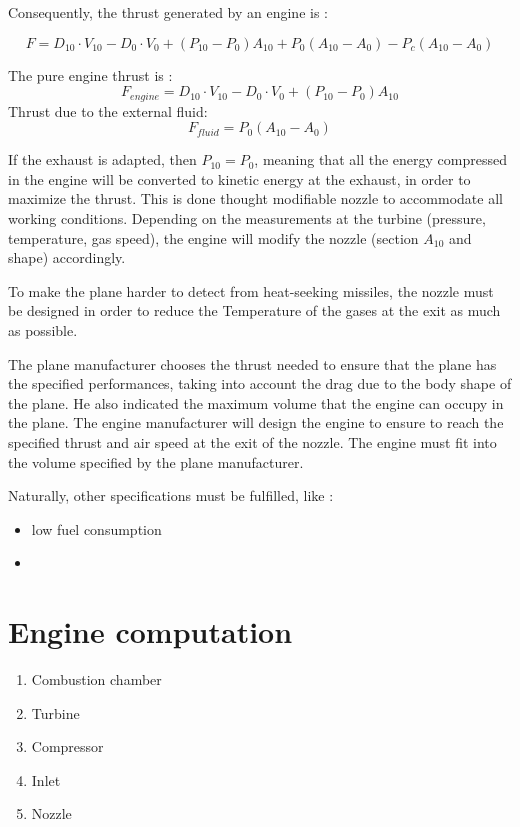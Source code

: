 \documentclass[12pt,a4paper]{article}
\begin{document}
	Consequently, the thrust generated by an engine is : 
	
	\begin{dmath}
		F = D_{10} \cdot V_{10} - D_{0} \cdot V_{0} + (P_{10} - P_0) A_{10} + P_0 (A_{10} -A_0) -  P_c (A_{10} - A_0)
	\end{dmath}
	
	The pure engine thrust is : 
	\begin{dmath}
		F_{engine} = D_{10} \cdot V_{10} - D_{0} \cdot V_{0} + (P_{10} - P_0) A_{10}
	\end{dmath}
	Thrust due to the external fluid:  
	\begin{dmath}
		F_{fluid} = P_0 (A_{10} -A_0)
	\end{dmath}
	
	If the exhaust is adapted, then $P_{10} = P_0$, meaning that all the energy compressed in the engine will be converted to kinetic energy at the exhaust, in order to maximize the thrust. This is done thought modifiable nozzle to accommodate all working conditions. Depending on the measurements at the turbine (pressure, temperature, gas speed), the engine will modify the nozzle (section $A_{10}$ and shape) accordingly. 
	
	To make the plane harder to detect from heat-seeking missiles, the nozzle must be designed in order to reduce the Temperature of the gases at the exit as much as possible. 
	
	The plane manufacturer chooses the thrust needed to ensure that the plane has the specified performances, taking into account the drag due to the body shape of the plane. He also indicated the maximum volume that the engine can occupy in the plane.
	The engine manufacturer will design the engine to ensure to reach the specified thrust and air speed at the exit of the nozzle. The engine must fit into the volume specified by the plane manufacturer. 
	
	Naturally, other specifications must be fulfilled, like :
	\begin{itemize}
		\item low fuel consumption
		\item 
	\end{itemize}

	\section{Engine computation}
	\begin{enumerate}
		\item Combustion chamber
		\item Turbine
		\item Compressor
		\item Inlet
		\item Nozzle
	\end{enumerate}
\end{document}
